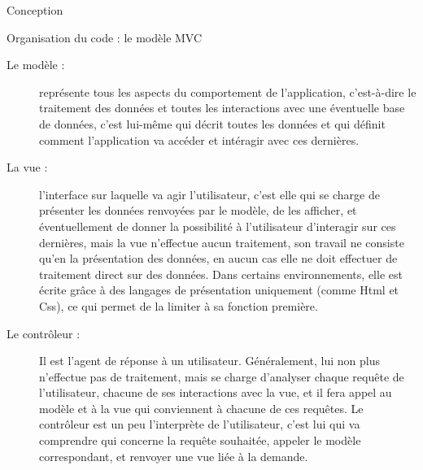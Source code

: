 \documentclass[a4paper, 12pt]{report}
\begin{document}
\begin{part}{Conception}
\begin{chapter}{Organisation du code : le modèle MVC}
			\begin{description}
				\item[Le modèle :] représente tous les aspects du comportement de l'application, c'est-à-dire le traitement des données
				et toutes les interactions avec une éventuelle base de données, c'est lui-même qui décrit toutes les données et qui 
				définit comment l'application va accéder et intéragir avec ces dernières.
				\item[La vue :] l'interface sur laquelle va agir l'utilisateur, c'est elle qui se charge de présenter les données
				renvoyées par le modèle, de les afficher, et éventuellement de donner la possibilité à l'utilisateur d'interagir sur 
				ces dernières, mais la vue n'effectue aucun traitement, son travail ne consiste qu'en la présentation des données, 
				en aucun cas elle ne doit effectuer de traitement direct sur des données. Dans certains environnements, elle est écrite 
				grâce à des langages de présentation uniquement (comme \gls{Html} et \gls{Css}), ce qui permet de la limiter à sa fonction première.
				\item[Le contrôleur :] Il est l'agent de réponse à un utilisateur. Généralement, lui non plus n'effectue pas de traitement,
				mais se charge d'analyser chaque requête de l'utilisateur, chacune de ses interactions avec la vue, et il fera appel
				au modèle et à la vue qui conviennent à chacune de ces requêtes. Le contrôleur est un peu l'interprète de l'utilisateur,
				c'est lui qui va comprendre qui concerne la requête souhaitée, appeler le modèle correspondant, et renvoyer une vue
				liée à la demande.
			\end{description}

		\end{chapter}
	\end{part}
\end{document}
